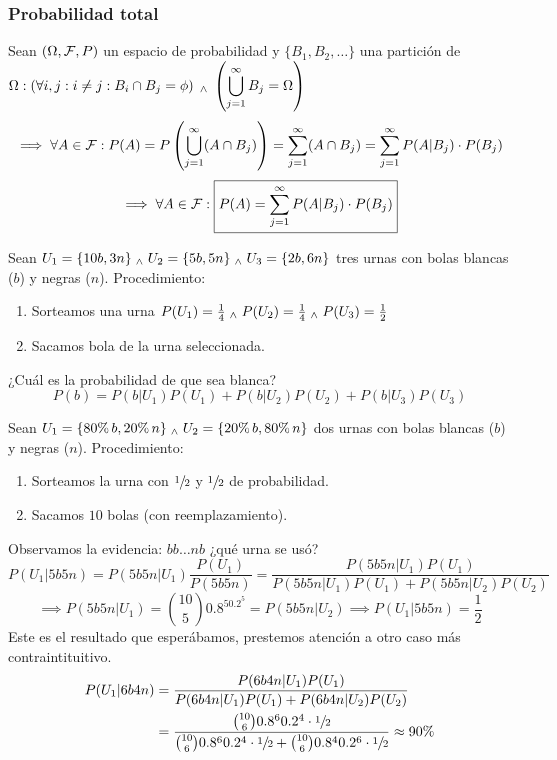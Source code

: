 \subsubsection{Probabilidad total}
\begin{prop}
	Sean $(\Omega, \mathcal{F}, P)$ un espacio de probabilidad y $\{B_1, B_2, \dots\}$ una partición de $\displaystyle \Omega : \left(\forall i, j :  i\ne j : B_i\cap B_j = \phi\right) \; _{\wedge} \; \left(\bigcup_{j=1}^\infty B_j=\Omega\right)$
	\[\implies \forall A \in \mathcal{F} : P(A)=P\left(\bigcup_{j=1}^\infty(A\cap B_j)\right)=\sum_{j=1}^\infty(A\cap B_j)=\sum_{j=1}^\infty P(A|B_j)\cdot P(B_j)\]
	\[\implies \forall A \in \mathcal{F} : \boxed{P(A) = \sum_{j=1}^\infty P(A|B_j)\cdot P(B_j)}\]
	\hfill \qedsymbol
\end{prop}
\begin{ejem}
	Sean $U_1=\{10b, 3n\} \; _{\wedge} \; U_2=\{5b, 5n\} \; _{\wedge} \; U_3=\{2b, 6n\}$ tres urnas con bolas blancas ($b$) y negras ($n$). Procedimiento:
	\begin{enumerate}[topsep=1pt, itemsep=1pt,parsep=3pt]
		\item Sorteamos una urna $P(U_1)=\frac{1}{4} \; _{\wedge} \; P(U_2)=\frac{1}{4} \; _{\wedge} \; P(U_3) = \frac{1}{2}$
		\item Sacamos bola de la urna seleccionada.
	\end{enumerate}
	¿Cuál es la probabilidad de que sea blanca?
	\[P(b)=P(b|U_1)P(U_1)+P(b|U_2)P(U_2)+P(b|U_3)P(U_3)\]
\end{ejem}

\begin{ejem}
	Sean $U_1=\{80\%\,b, 20\%\,n\} \; _{\wedge} \; U_2=\{20\%\,b, 80\%\,n\}$ dos urnas con bolas blancas ($b$) y negras ($n$). Procedimiento:
	\begin{enumerate}[topsep=1pt, itemsep=1pt,parsep=3pt]
		\item Sorteamos la urna con $\sfrac{1}{2}$ y $\sfrac{1}{2}$ de probabilidad.
		\item Sacamos $10$ bolas (con reemplazamiento).
	\end{enumerate}
	Observamos la evidencia: $bb\dots nb$ ¿qué urna se usó?
	\[P(U_1|5b5n)=P(5b5n|U_1)\frac{P(U_1)}{P(5b5n)}=\frac{P(5b5n|U_1)P(U_1)}{P(5b5n|U_1)P(U_1)+P(5b5n|U_2)P(U_2)}\]
	\[\implies P(5b5n|U_1)=\binom{10}{5}0.8^50.2^5=P(5b5n|U_2) \implies P(U_1|5b5n)=\frac{1}{2}\]
	Este es el resultado que esperábamos, prestemos atención a otro caso más contraintituitivo.
	\[\begin{aligned}
			P(U_1|6b4n) & = \frac{P(6b4n|U_1)P(U_1)}{P(6b4n|U_1)P(U_1)+P(6b4n|U_2)P(U_2)}                                                                                   \\
			            & = \frac{\binom{10}{6}0.8^60.2^4\cdot\sfrac{1}{2}}{\binom{10}{6}0.8^60.2^4\cdot\sfrac{1}{2} + \binom{10}{6}0.8^40.2^6\cdot\sfrac{1}{2}}\approx90\%
		\end{aligned}\]
\end{ejem}
\begin{wrapfigure}{r}{4.3cm}
	
\end{wrapfigure}

